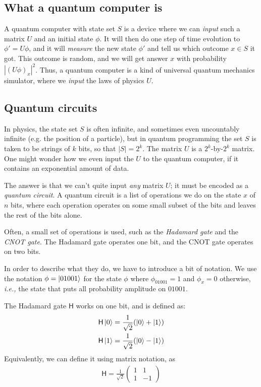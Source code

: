 \documentclass[a4paper, 11pt]{article}
\theoremstyle{definition}
\newcommand{\ie}{\textit{i.e.,}\xspace}
\begin{document}
\subsection{What a quantum computer is}

A quantum computer with state set $S$ is a device where we can \emph{input} such a matrix $U$ and an initial state $\phi$.
It will then do one step of time evolution to $\phi' = U\phi$, and it will \emph{measure} the new state $\phi'$ and tell us which outcome $x \in S$ it got.
This outcome is random, and we will get answer $x$ with probability $|(U\phi)_x|^2$.
Thus, a quantum computer is a kind of universal quantum mechanics simulator, where we \emph{input} the laws of physics $U$.

\subsection{Quantum circuits}

In physics, the state set $S$ is often infinite, and sometimes even uncountably infinite (e.g. the position of a particle),
but in quantum programming the set $S$ is taken to be strings of $k$ bits, so that $|S| = 2^k$.
The matrix $U$ is a $2^k$-by-$2^k$ matrix. One might wonder how we even input the $U$ to the quantum computer, if it contains an exponential amount of data.

The answer is that we can't quite input \emph{any} matrix $U$; it must be encoded as a \emph{quantum circuit}.
A quantum circuit is a list of operations we do on the state $x$ of $n$ bits, where each operation operates on some small subset of the bits and leaves the rest of the bits alone.

Often, a small set of operations is used, such as the \emph{Hadamard gate} and the \emph{CNOT gate}.
The Hadamard gate operates one bit, and the CNOT gate operates on two bits.

In order to describe what they do, we have to introduce a bit of notation.
We use the notation $\phi = \ket{01001}$ for the state $\phi$ where $\phi_{01001} = 1$ and $\phi_x = 0$ otherwise, \ie the state that puts all probability amplitude on $01001$.

\newcommand{\Ha}{\mathsf{H}}
\newcommand{\CNOT}{\mathsf{CNOT}}
\newcommand{\CCNOT}{\mathsf{CCNOT}}

The Hadamard gate $\Ha$ works on one bit, and is defined as:
\begin{align*}
  \Ha\ket{0} = \frac{1}{\sqrt{2}}(\ket{0} + \ket{1}) \\
  \Ha\ket{1} = \frac{1}{\sqrt{2}}(\ket{0} - \ket{1})
\end{align*}
Equivalently, we can define it using matrix notation, as
\begin{align*}
  \Ha = \frac{1}{\sqrt{2}}\begin{pmatrix}
    1 & 1 \\
    1 & -1
  \end{pmatrix}
\end{align*}
\end{document}
